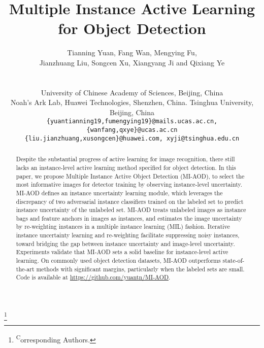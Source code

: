 \documentclass[final]{cvpr}
\newcommand\nmfootnote[1]{\begingroup
  \renewcommand\thefootnote{}\footnote{#1}\addtocounter{footnote}{-1}\endgroup
}
\begin{document}
\title{Multiple Instance Active Learning for Object Detection}

\author{
Tianning Yuan\textsuperscript{}, Fang Wan\textsuperscript{\footnotemark[1]}, Mengying Fu\textsuperscript{},\\
Jianzhuang Liu\textsuperscript{}, Songcen Xu\textsuperscript{}, Xiangyang Ji\textsuperscript{} and Qixiang Ye\textsuperscript{\footnotemark[1]}\\
\\
\\
\textsuperscript{}University of Chinese Academy of Sciences, Beijing, China\\
\textsuperscript{}Noah’s Ark Lab, Huawei Technologies, Shenzhen, China. \textsuperscript{}Tsinghua University, Beijing, China\\
\tt\small \{yuantianning19,fumengying19\}@mails.ucas.ac.cn, \{wanfang,qxye\}@ucas.ac.cn\\
\tt\small \{liu.jianzhuang,xusongcen\}@huawei.com, xyji@tsinghua.edu.cn

}

\maketitle


\nmfootnote{\textsuperscript*Corresponding Authors.} 

\begin{abstract}

Despite the substantial progress of active learning for image recognition, there still lacks an instance-level active learning method specified for object detection. In this paper, we propose Multiple Instance Active Object Detection (MI-AOD), to select the most informative images for detector training by observing instance-level uncertainty. MI-AOD defines an instance uncertainty learning module, which leverages the discrepancy of two adversarial instance classifiers trained on the labeled set to predict instance uncertainty of the unlabeled set. MI-AOD treats unlabeled images as instance bags and feature anchors in images as instances, and estimates the image uncertainty by re-weighting instances in a multiple instance learning (MIL) fashion. Iterative instance uncertainty learning and re-weighting facilitate suppressing noisy instances, toward bridging the gap between instance uncertainty and image-level uncertainty. Experiments validate that MI-AOD sets a solid baseline for instance-level active learning. On commonly used object detection datasets, MI-AOD outperforms state-of-the-art methods with significant margins, particularly when the labeled sets are small. 
Code is available at \href{https://github.com/yuantn/MI-AOD}{https://github.com/yuantn/MI-AOD}.

\end{abstract}
\end{document}
